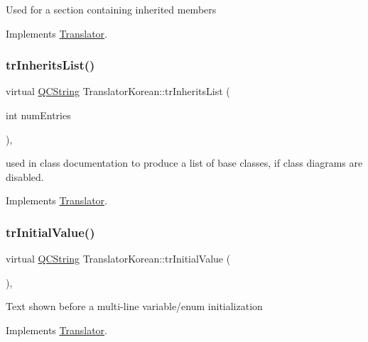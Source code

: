 Used for a section containing inherited members 

Implements \mbox{\hyperlink{class_translator}{Translator}}.

\mbox{\label{class_translator_korean_a62cc3f6b49464ef5dd2510acb27fb8a3}} 
\subsubsection{\texorpdfstring{trInheritsList()}{trInheritsList()}}
{\footnotesize\ttfamily virtual \mbox{\hyperlink{class_q_c_string}{Q\+C\+String}} Translator\+Korean\+::tr\+Inherits\+List (\begin{DoxyParamCaption}\item[{int}]{num\+Entries }\end{DoxyParamCaption})\hspace{0.3cm}{\ttfamily [inline]}, {\ttfamily [virtual]}}

used in class documentation to produce a list of base classes, if class diagrams are disabled. 

Implements \mbox{\hyperlink{class_translator}{Translator}}.

\mbox{\label{class_translator_korean_af07d6e70c8d3d6b2b2ab81e88e1bb887}} 
\subsubsection{\texorpdfstring{trInitialValue()}{trInitialValue()}}
{\footnotesize\ttfamily virtual \mbox{\hyperlink{class_q_c_string}{Q\+C\+String}} Translator\+Korean\+::tr\+Initial\+Value (\begin{DoxyParamCaption}{ }\end{DoxyParamCaption})\hspace{0.3cm}{\ttfamily [inline]}, {\ttfamily [virtual]}}

Text shown before a multi-\/line variable/enum initialization 

Implements \mbox{\hyperlink{class_translator}{Translator}}.

\mbox{\label{class_translator_korean_a65a32b76e6abc671c7d7aba9594613b1}} 

